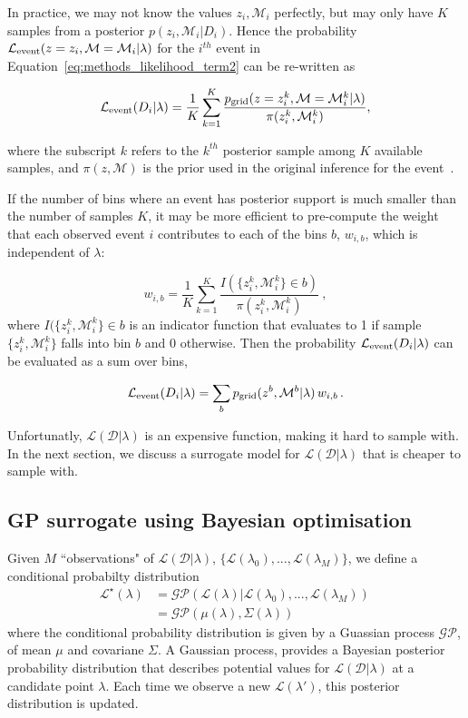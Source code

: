 \documentclass[twocolumn]{aastex631}
\newcommand{\Mc}{\ensuremath{\mathcal{M}}\xspace}
\newcommand{\Lmain}{\ensuremath{\mathcal{L}(\mathcal{D}|\lambda)}\xspace}
\newcommand{\Le}{\ensuremath{\mathcal{L}_{\rm event}}\xspace}
\newcommand{\pg}{\ensuremath{p_{\rm grid}}\xspace}
\newcommand{\Lsurr}{\ensuremath{\mathcal{L}^{\star}(\lambda)}\xspace}
\begin{document}
 In practice, we may not know the values $z_i, \Mc_{i}$ perfectly,  but may only have $K$ samples from a posterior $p(z_i,\Mc_{i}|D_i)$.
 Hence the probability $\Le(z=z_i,\Mc=\Mc_{i}|\lambda)$ for the  $i^{th}$ event in Equation~\ref{eq:methods_likelihood_term2} can be re-written as

\begin{equation}
  \Le(D_i|\lambda) = \frac{1}{K} \sum_{k=1}^K \frac{\pg(z=z_i^k, \Mc=\Mc_{i}^k|\lambda)}{\pi(z_i^k,\Mc_i^k)},
  \label{eq:methods_likelihood_term2_LIGO}
\end{equation}

\bigskip\noindent
where the subscript $k$ refers to the $k^{th}$ posterior sample among $K$ available samples, and $\pi(z,\Mc)$ is the prior used in the original inference for the event~\citep[see, e.g.][]{Mandel_2019}.

 If the number of bins where an event has posterior support is much smaller than the number of samples $K$, it may be more efficient to pre-compute the weight that each observed event $i$ contributes to each of the bins $b$, $w_{i,b}$, which is independent of $\lambda$:

\begin{equation}
    w_{i,b} = \frac{1}{K} \sum^K_{k=1} \frac{I(\{z^k_i,\Mc^k_i\} \in b)}{\pi(z_i^k,\Mc_i^k)} \ ,
\end{equation}
where $I(\{z^k_i,\Mc^k_i\} \in b$ is an indicator function that evaluates to 1 if sample $\{z^k_i,\Mc^k_i\}$ falls into bin $b$ and $0$ otherwise.
Then the probability $\Le(D_i|\lambda)$ can be evaluated as a sum over bins,

\begin{equation}
    \Le(D_i|\lambda) = \sum_b \pg(z^b, \Mc^b | \lambda)\,  w_{i,b}\, .
\end{equation}


Unfortunatly, \Lmain is an expensive function, making it hard to sample with.
In the next section, we discuss a surrogate model for \Lmain that is cheaper to sample with.

\subsection{GP surrogate using Bayesian optimisation }
Given  $M$ ``observations" of \Lmain, $\{\mathcal{L}(\lambda_0), ..., \mathcal{L}(\lambda_M)\}$, we  define a conditional probabilty distribution
\begin{align}
    \Lsurr &= \mathcal{GP}( \mathcal{L}(\lambda) | \mathcal{L}(\lambda_0), ..., \mathcal{L}(\lambda_M))\, \nonumber \\
    &= \mathcal{GP}(\mu(\lambda), \Sigma(\lambda))
\end{align}
where the conditional probability distribution is given by a Guassian process $\mathcal{GP}$, of mean $\mu$ and covariane $\Sigma$.
A Gaussian process, provides a Bayesian posterior probability
distribution that describes potential values for $\Lmain$ at a candidate point $\lambda$.
Each time we observe a new $\mathcal{L}(\lambda')$, this posterior distribution is updated.
\end{document}
